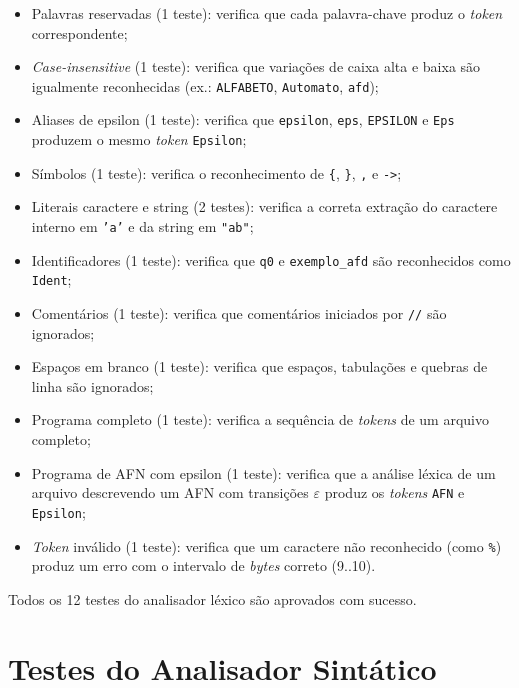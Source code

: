\documentclass[
    12pt
    ,oneside
    ,a4paper
    ,chapter=TITLE
    ,section=TITLE
    ,sumario=abnt-6027-2012]{abntex2}
\begin{document}
\begin{itemize}
    \item Palavras reservadas (1 teste): verifica que cada palavra-chave produz
          o \textit{token} correspondente;
    \item \textit{Case-insensitive} (1 teste): verifica que variações de caixa alta e
          baixa são igualmente reconhecidas (ex.: \texttt{ALFABETO}, \texttt{Automato},
          \texttt{afd});
    \item Aliases de epsilon (1 teste): verifica que \texttt{epsilon},
          \texttt{eps}, \texttt{EPSILON} e \texttt{Eps} produzem o mesmo
          \textit{token} \texttt{Epsilon};
    \item Símbolos (1 teste): verifica o reconhecimento de \texttt{\{},
          \texttt{\}}, \texttt{,} e \texttt{->};
    \item Literais caractere e string (2 testes): verifica a correta extração
          do caractere interno em \texttt{'a'} e da string em \texttt{"ab"};
    \item Identificadores (1 teste): verifica que \texttt{q0} e
          \texttt{exemplo\_afd} são reconhecidos como \texttt{Ident};
    \item Comentários (1 teste): verifica que comentários iniciados por
          \texttt{//} são ignorados;
    \item Espaços em branco (1 teste): verifica que espaços, tabulações e
          quebras de linha são ignorados;
    \item Programa completo (1 teste): verifica a sequência de \textit{tokens}
          de um arquivo completo;
    \item Programa de AFN com epsilon (1 teste): verifica que a análise léxica de um
          arquivo descrevendo um AFN com transições $\varepsilon$ produz os
          \textit{tokens} \texttt{AFN} e \texttt{Epsilon};
    \item \textit{Token} inválido (1 teste): verifica que um caractere não reconhecido
          (como \texttt{\%}) produz um erro com o intervalo de \textit{bytes}
          correto (9..10).
\end{itemize}

Todos os 12 testes do analisador léxico são aprovados com sucesso.

\section{Testes do Analisador Sintático}
\label{sec:res-parser}
\end{document}
